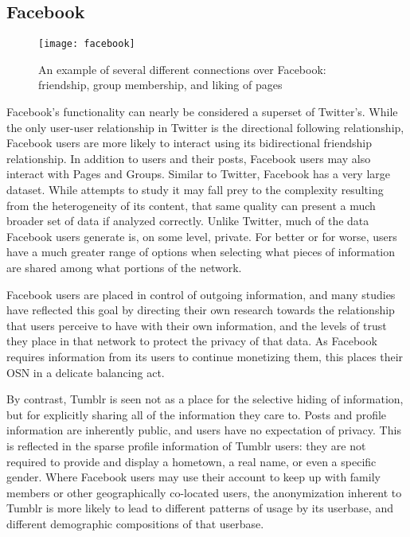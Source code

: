 \subsection{Facebook}
\begin{figure}[bht]
\centering
 \texttt{[image: facebook]}
 \caption{An example of several different connections over Facebook: friendship, group membership, and liking of pages}
 \label{fig:facebook}
\end{figure}
Facebook's functionality can nearly be considered a superset of Twitter's.  
While the only user-user relationship in Twitter is the directional following 
relationship, Facebook users are more likely to interact using its 
bidirectional friendship relationship.  In addition to users and their 
posts, Facebook users may also interact with Pages and Groups.  
Similar to Twitter, Facebook has a very large dataset.  While attempts 
to study it may fall prey to the complexity resulting from the 
heterogeneity of its content, that same quality can present a much 
broader set of data if analyzed correctly.  Unlike Twitter, much of 
the data Facebook users generate is, on some level, private.  For 
better or for worse, users have a much greater range of options when 
selecting what pieces of information are shared among what portions 
of the network.


Facebook users are placed in control of outgoing information, 
and many studies have reflected this goal by directing their own 
research\cite{dwyer2007trust, lipford2008understanding}
towards the relationship that users perceive to have with their own 
information, and the levels of trust they place in that network to 
protect the privacy of that data.  As Facebook requires information 
from its users to continue monetizing them, this places their OSN in 
a delicate balancing act.


By contrast, Tumblr is seen not as a place for the selective hiding of 
information\cite{liu2011analyzing}, but for explicitly sharing all of 
the information they care to.  Posts and profile information are 
inherently public, and users have no expectation of privacy.  This is 
reflected in the sparse profile information of Tumblr users: they are 
not required to provide and display a hometown, a real name, or even a 
specific gender.  Where Facebook users may use their account to keep 
up with family members\cite{joinson2008looking} or other geographically 
co-located users, the anonymization\cite{alexander2002introduction} 
inherent to Tumblr is more likely to lead to different patterns of 
usage by its userbase, and different demographic 
compositions\cite{drager2012trans} of that userbase.  


